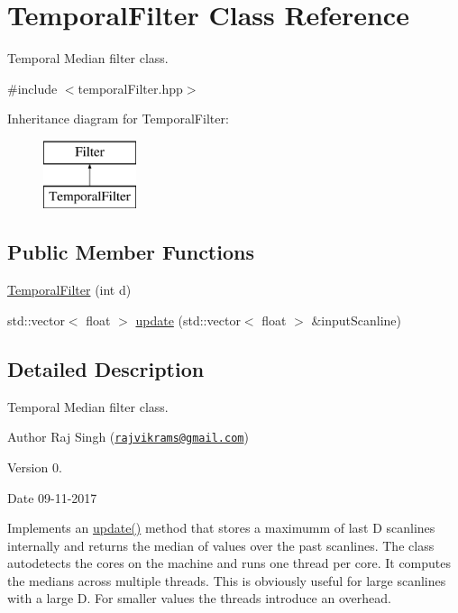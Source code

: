 \hypertarget{class_temporal_filter}{}\section{Temporal\+Filter Class Reference}
\label{class_temporal_filter}


Temporal Median filter class.  




{\ttfamily \#include $<$temporal\+Filter.\+hpp$>$}

Inheritance diagram for Temporal\+Filter\+:\begin{figure}[H]
\begin{center}
\leavevmode
\includegraphics[height=2.000000cm]{class_temporal_filter}
\end{center}
\end{figure}
\subsection*{Public Member Functions}
\begin{DoxyCompactItemize}
\item 
\hyperlink{class_temporal_filter_a251e59cf00b8978af4bdb662573ba7f5}{Temporal\+Filter} (int d)
\item 
std\+::vector$<$ float $>$ \hyperlink{class_temporal_filter_ae08295aa926fa2bdfc64a5836cc0ac3a}{update} (std\+::vector$<$ float $>$ \&input\+Scanline)
\end{DoxyCompactItemize}


\subsection{Detailed Description}
Temporal Median filter class. 

\begin{DoxyAuthor}{Author}
Raj Singh (\href{mailto:rajvikrams@gmail.com}{\tt rajvikrams@gmail.\+com}) 
\end{DoxyAuthor}
\begin{DoxyVersion}{Version}
0. 
\end{DoxyVersion}
\begin{DoxyDate}{Date}
09-\/11-\/2017
\end{DoxyDate}
Implements an \hyperlink{class_temporal_filter_ae08295aa926fa2bdfc64a5836cc0ac3a}{update()} method that stores a maximumm of last D scanlines internally and returns the median of values over the past scanlines. The class autodetects the cores on the machine and runs one thread per core. It computes the medians across multiple threads. This is obviously useful for large scanlines with a large D. For smaller values the threads introduce an overhead.

